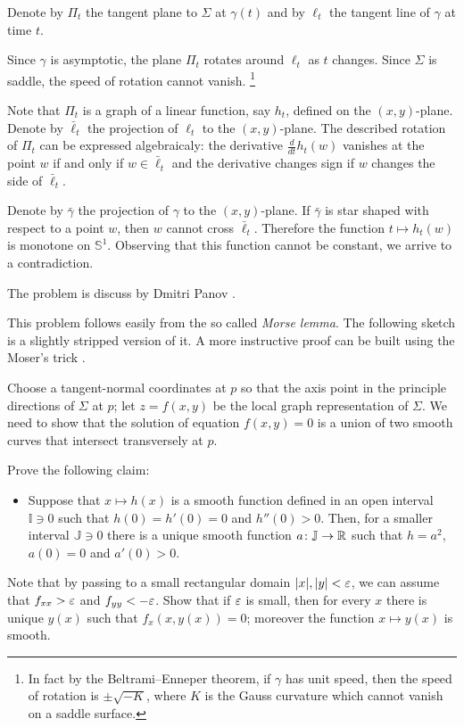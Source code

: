  Denote by $\Pi_t$ the tangent plane to $\Sigma$ at $\gamma(t)$ and by $\ell_t$ the tangent line of $\gamma$ at time $t$.

Since $\gamma$ is asymptotic, the plane $\Pi_t$ rotates around $\ell_t$ as $t$ changes.
Since $\Sigma$ is saddle, the speed of rotation cannot vanish.%
\footnote{In fact by the Beltrami--Enneper theorem, if $\gamma$ has unit speed, then the speed of rotation is $\pm\sqrt{-K}$, where $K$ is the Gauss curvature which cannot vanish on a saddle surface.}

Note that $\Pi_t$ is a graph of a linear function, say $h_t$, defined on the $(x, y)$-plane.
Denote by $\bar\ell_t$ the projection of $\ell_t$ to the $(x, y)$-plane.
The described rotation of $\Pi_t$ can be expressed algebraicaly:
the derivative $\tfrac{d}{dt}h_t(w)$ vanishes at the point $w$ if and only if $w\in \bar\ell_t$ 
and the derivative changes sign if $w$ changes the side of $\bar\ell_t$.

Denote by $\bar\gamma$ the projection of $\gamma$ to the $(x, y)$-plane.
If $\bar\gamma$ is star shaped with respect to a point $w$, then $w$ cannot cross $\bar\ell_t$.
Therefore the function $t\mapsto h_t(w)$ is monotone on $\mathbb{S}^1$.
Observing that this function cannot be constant, we arrive to a contradiction.

 The problem is discuss by Dmitri Panov \cite{panov-curves}.

This problem follows easily from the so called \emph{Morse lemma}.
The following sketch is a slightly stripped version of it.
A more instructive proof can be built using the Moser's trick \cite{palais}.

\medskip

Choose a tangent-normal coordinates at $p$ so that the axis point in the principle directions of $\Sigma$ at $p$;
let $z=f(x,y)$ be the local graph representation of $\Sigma$.
We need to show that the solution of equation $f(x,y)=0$ is a union of two smooth curves that intersect transversely at $p$.

Prove the following claim:
\begin{itemize}
 \item Suppose that  $x\mapsto h(x)$ is a smooth function defined in an open interval $\mathbb{I}\ni0$ such that $h(0)=h'(0)=0$ and $h''(0)>0$.
 Then, for a smaller interval $\mathbb{J}\ni0$ there is a unique smooth function $a\colon\mathbb{J}\to\mathbb{R}$ such that $h=a^2$, $a(0)=0$ and $a'(0)> 0$.
\end{itemize}
Note that by passing to a small rectangular domain $|x|,|y|<\varepsilon$, we can assume that $f_{xx}>\varepsilon$ and $f_{yy}<-\varepsilon$. 
Show that if $\varepsilon$ is small, then for every $x$ there is unique $y(x)$ such that $f_x(x,y(x))=0$; 
moreover the function $x\mapsto y(x)$ is smooth.

